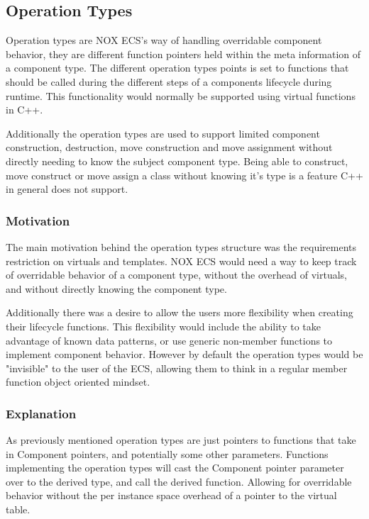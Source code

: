 \subsection{Operation Types}
\label{subsec:detailed_operation_types}
Operation types are NOX ECS's way of handling overridable component behavior,
they are different function pointers held within the meta information of a component type.
The different operation types points is set to functions that should be called during the different steps
of a components lifecycle during runtime.
This functionality would normally be supported using virtual functions in C++.

Additionally the operation types are used to support limited component construction, destruction,
move construction and move assignment without directly needing to know the subject component type.
Being able to construct, move construct or move assign a class without knowing it's type is a feature
C++ in general does not support. 

\subsubsection{Motivation}
The main motivation behind the operation types structure was the requirements restriction on virtuals and templates. 
NOX ECS would need a way to keep track of overridable behavior of a component type, without the overhead of virtuals,
and without directly knowing the component type.

Additionally there was a desire to allow the users more flexibility when creating their lifecycle functions.
This flexibility would include the ability to take advantage of known data patterns,
or use generic non-member functions to implement component behavior.
However by default the operation types would be "invisible" to the user of the ECS,
allowing them to think in a regular member function object oriented mindset.

\subsubsection{Explanation}
As previously mentioned operation types are just pointers to functions that take in Component pointers,
and potentially some other parameters.
Functions implementing the operation types will cast the Component pointer parameter over to the derived type,
and call the derived function.
Allowing for overridable behavior without the per instance space overhead of a pointer to the virtual table.

